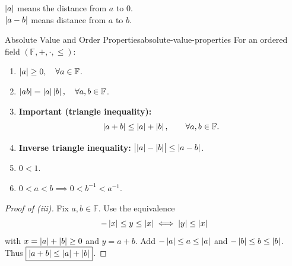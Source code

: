 \begin{thinking}
  $\left\lvert a \right\rvert$ means the distance from $a$ to $0$.\\
  $\left\lvert a-b \right\rvert$ means distance from $a$ to $b$.
  \begin{center}
  \end{center}
\end{thinking}

\begin{theorem}{Absolute Value and Order Properties}{absolute-value-properties}
  For an ordered field $(\mathbb{F},+,\cdot,\le)$:
  \begin{enumerate}[label=(\roman*)]
    \item $\left\lvert a \right\rvert\ge0,\quad\forall a\in\mathbb{F}$.
    \item $\left\lvert ab \right\rvert=\left\lvert a \right\rvert\left\lvert b \right\rvert,\quad\forall a,b\in\mathbb{F}$.
    \item \textbf{Important (triangle inequality):}
          \[
            \left\lvert a+b \right\rvert\le\left\lvert a \right\rvert+\left\lvert b \right\rvert,\qquad\forall a,b\in\mathbb{F}.
          \]
    \item \textbf{Inverse triangle inequality:}
          $\bigl|\left\lvert a \right\rvert-\left\lvert b \right\rvert\bigr|\le\left\lvert a-b \right\rvert$.
    \item $0<1$.
    \item $0<a<b\implies 0<b^{-1}<a^{-1}$.
  \end{enumerate}
\end{theorem}

\begin{proof}[Proof of (iii)]
  Fix $a,b\in\mathbb F$. Use the equivalence
  \[
    -\left\lvert x \right\rvert\le y\le\left\lvert x \right\rvert\iff\left\lvert y \right\rvert\le\left\lvert x \right\rvert
  \]
  with $x=\left\lvert a \right\rvert+\left\lvert b \right\rvert\ge0$ and $y=a+b$.
  Add $-\left\lvert a \right\rvert\le a\le\left\lvert a \right\rvert$ and $-\left\lvert b \right\rvert\le b\le\left\lvert b \right\rvert$.
  Thus $\boxed{\left\lvert a+b \right\rvert\le\left\lvert a \right\rvert+\left\lvert b \right\rvert}$.
\end{proof}

